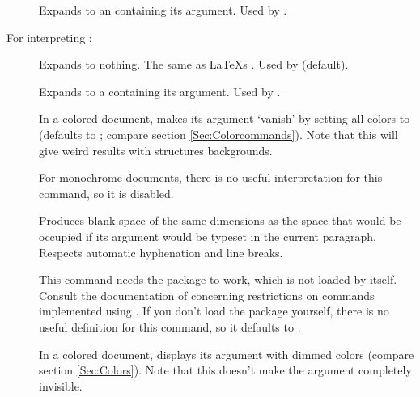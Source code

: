 \begin{slide}
\begin{description}
  \item[]
    Expands to an  containing its argument. Used by
    .
  \end{description}

  \newslide

  For interpreting :
  \begin{description}
  \item[]
    Expands to nothing. The same as \LaTeX s . Used by
     (default).

  \item[]
    Expands to a  containing its argument. Used by
    .

  \item[]
    In a colored document, makes its argument `vanish' by setting all colors to
     (defaults to ; compare section
    \ref{Sec:Colorcommands}). Note that this will give weird results with
    structures backgrounds.

    For monochrome documents, there is no useful interpretation for this command, so it is disabled.

    \newslide

  \item[{}]
    Produces blank space of the same dimensions as the space that would be
    occupied if its argument would be typeset in the current paragraph. Respects automatic hyphenation and line breaks.

    This command needs the \href{ftp://ftp.dante.de/tex-archive/help/Catalogue/entries/soul.html}{} package
    to work, which is not loaded by  itself. Consult the documentation of
    \href{ftp://ftp.dante.de/tex-archive/help/Catalogue/entries/soul.html}{} concerning restrictions on
    commands implemented using . If you don't load the  package yourself, there is no useful
    definition for this command, so it defaults to .

    \newslide

  \item[]
    In a colored document, displays its argument with dimmed colors (compare
    section \ref{Sec:Colors}). Note that this doesn't make the argument completely invisible.


\end{description}
\end{slide}
